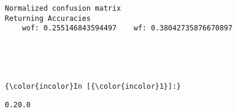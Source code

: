 \documentclass[11pt]{article}
\begin{document}
    \begin{Verbatim}[commandchars=\\\{\}]
Normalized confusion matrix
Returning Accuracies
	wof: 0.255146843594497    wf: 0.38042735876670897	
    \end{Verbatim}

    \begin{center}
    \end{center}
    { \hspace*{\fill} \\}
    
    \begin{center}
    \end{center}
    { \hspace*{\fill} \\}
    
    \begin{Verbatim}[commandchars=\\\{\}]
{\color{incolor}In [{\color{incolor}1}]:} 
\end{Verbatim}


    \begin{Verbatim}[commandchars=\\\{\}]
0.20.0

    \end{Verbatim}


    
    
    
    
\end{document}
